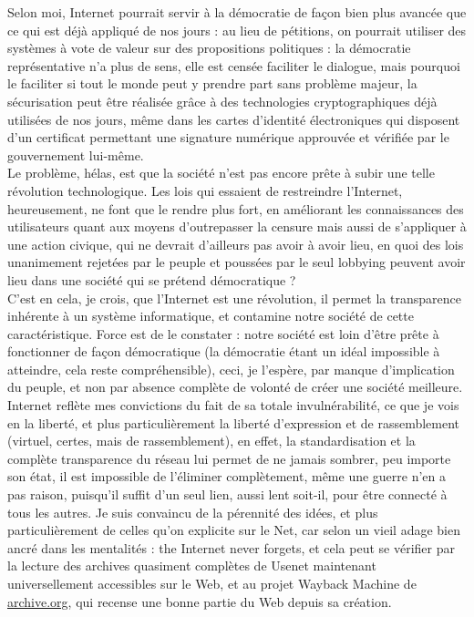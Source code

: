 \documentclass[12pt,a4paper]{article}
\begin{document}
{Selon moi, Internet pourrait servir à la démocratie de façon bien plus avancée que ce qui est déjà appliqué de nos jours : au lieu de pétitions, on pourrait utiliser des systèmes à vote de valeur sur des propositions politiques : la \og{}démocratie\fg{} représentative n'a plus de sens, elle est censée faciliter le dialogue, mais pourquoi le faciliter si tout le monde peut y prendre part sans problème majeur, la sécurisation peut être réalisée grâce à des technologies cryptographiques déjà utilisées de nos jours, même dans les cartes d'identité électroniques qui disposent d'un certificat permettant une signature numérique approuvée et vérifiée par le gouvernement lui-même.\\

Le problème, hélas, est que la société n'est pas encore prête à subir une telle révolution technologique. Les lois qui essaient de restreindre l'Internet, heureusement, ne font que le rendre plus fort, en améliorant les connaissances des utilisateurs quant aux moyens d'outrepasser la censure mais aussi de s'appliquer à une action civique, qui ne devrait d'ailleurs pas avoir à avoir lieu, en quoi des lois unanimement rejetées par le peuple et poussées par le seul lobbying peuvent avoir lieu dans une société qui se prétend démocratique ?\\

C'est en cela, je crois, que l'Internet est une révolution, il permet la transparence inhérente à un système informatique, et contamine notre société de cette caractéristique. Force est de le constater : notre société est loin d'être prête à fonctionner de façon démocratique (la démocratie étant un idéal impossible à atteindre, cela reste compréhensible), ceci, je l'espère, par manque d'implication du peuple, et non par absence complète de volonté de créer une société meilleure.\\

Internet reflète mes convictions du fait de sa totale invulnérabilité, ce que je vois en la liberté, et plus particulièrement la liberté d'expression et de rassemblement (\og{}virtuel\fg{}, certes, mais de rassemblement), en effet, la standardisation et la complète transparence du réseau lui permet de ne jamais sombrer, peu importe son état, il est impossible de l'éliminer complètement, même une guerre n'en a pas raison, puisqu'il suffit d'un seul lien, aussi lent soit-il, pour être connecté à tous les autres. Je suis convaincu de la pérennité des idées, et plus particulièrement de celles qu'on explicite sur le Net, car selon un vieil adage bien ancré dans les mentalités : \og{}the Internet never forgets\fg{}, et cela peut se vérifier par la lecture des archives quasiment complètes de Usenet maintenant universellement accessibles sur le Web, et au projet Wayback Machine de \url{archive.org}, qui recense une bonne partie du Web depuis sa création.\\

}
\end{document}

